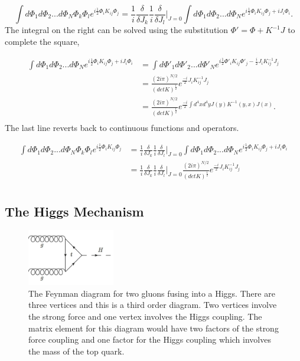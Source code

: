 \begin{equation}
\int d\Phi_1 d\Phi_2 ... d\Phi_N \Phi_k\Phi_l e^{i\frac{1}{2}\Phi_{i} K_{ij} \Phi_{j}} 
= \frac{1}{i}\frac{\delta}{\delta J_k}\frac{1}{i}\frac{\delta}{\delta J_l}\Big|_{J=0} 
\int d\Phi_1 d\Phi_2 ... d\Phi_N e^{i\frac{1}{2}\Phi_{i} K_{ij} \Phi_{j} + iJ_i\Phi_i}. 
\end{equation}
The integral on the right can be solved using the substitution $\Phi' = \Phi + K^{-1}J$ to complete the square, 

\begin{equation}
\begin{split}
\int d\Phi_1 d\Phi_2 ... d\Phi_N e^{i\frac{1}{2}\Phi_{i} K_{ij} \Phi_{j} + iJ_i\Phi_i} 
&= \int d\Phi'_1 d\Phi'_2 ... d\Phi'_N e^{i\frac{1}{2}\Phi'_{i} K_{ij} \Phi'_{j} - \frac{i}{2}J_i K^{-1}_{ij} J_j}\\ 
&= \frac{\left( 2i\pi \right)^{N/2}}{ \left( detK \right)^\frac{1}{2}}e^{\frac{-i}{2}J_i K^{-1}_{ij} J_j}\\
&= \frac{\left( 2i\pi \right)^{N/2}}{ \left( detK \right)^\frac{1}{2}}e^{\frac{-i}{2}\int d^4x d^4y J(y) K^{-1}(y,x) J(x)}.\\
\end{split}
\end{equation}
The last line reverts back to continuous functions and operators.

\begin{equation}
\begin{split}
\int d\Phi_1 d\Phi_2 ... d\Phi_N \Phi_k\Phi_l e^{i\frac{1}{2}\Phi_{i} K_{ij} \Phi_{j}} 
& = \frac{1}{i}\frac{\delta}{\delta J_k}\frac{1}{i}\frac{\delta}{\delta J_l}\Big|_{J=0} \int d\Phi_1 d\Phi_2 ... d\Phi_N e^{i\frac{1}{2}\Phi_{i} K_{ij} \Phi_{j} + iJ_i\Phi_i} \\
& = \frac{1}{i}\frac{\delta}{\delta J_k}\frac{1}{i}\frac{\delta}{\delta J_l}\Big|_{J=0} \frac{\left( 2i\pi \right)^{N/2}}{ \left( detK \right)^\frac{1}{2}}e^{\frac{-i}{2}J_i K^{-1}_{ij} J_j} \\ 
\end{split}
\end{equation}

\subsection{The Higgs Mechanism}

\begin{figure}[h!]
  \centering
  \includegraphics[width=1.5in]{images/ggf.png}
  \caption
   {The Feynman diagram for two gluons fusing into a Higgs. There are three vertices and this is a third order diagram. Two vertices involve the strong force and one vertex involves the Higgs coupling. The matrix element for this diagram would have two factors of the strong force coupling and one factor for the Higgs coupling which involves the mass of the top quark.}
  \label{fig:feynggf}
\end{figure}

